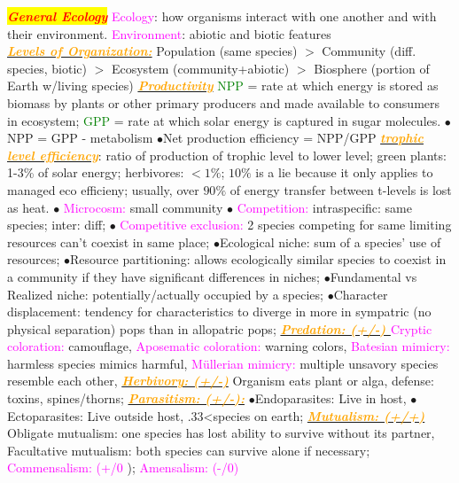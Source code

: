\documentclass{article}
\author{SBHS Science Olympiad, Tarang}
\newcommand{\ddd}{$\bullet$}
\newcommand{\red}[1]{\textcolor{red}{#1}}
\newcommand{\green}[1]{\textcolor{green}{#1}}
\newcommand{\pink}[1]{\textcolor{magenta}{#1}}
\newcommand{\orange}[1]{\textcolor{orange}{#1}}
\newcommand{\mysection}[1]{\colorbox{yellow}{\textbf{\textit{\red{#1}}}}}
\newcommand{\mysubsection}[1]{\underline{\textbf{{\textit{\orange{#1}}}}}}
\begin{document}
\tiny
\begin{multicols*}{4}

    \mysection{General Ecology} 
        \pink{Ecology}: how organisms interact with one another and with their environment. 
        \pink{Environment}: abiotic and biotic features\\
        \mysubsection{\textit{Levels of Organization:}} Population (same species) $>$  Community (diff. species, biotic) $>$ Ecosystem (community+abiotic) $>$ Biosphere (portion of Earth w/living species)
        \mysubsection{Productivity}
        \green{NPP} = rate at which energy is stored as biomass by plants or other primary producers and made available to consumers in ecosystem; \green{GPP} = rate at which solar energy is captured in sugar molecules.
        \ddd NPP = GPP - metabolism \ddd Net production efficiency = NPP/GPP
        \mysubsection{trophic level efficiency}: ratio of production of trophic level to lower level; green plants: 1-3\% of solar energy; herbivores: $ <1\% $; $ 10\% $ is a lie because it only applies to managed eco efficieny; usually, over $ 90\% $ of energy transfer between t-levels is lost as heat.
        \ddd \pink{ Microcosm: } small community 
        \ddd \pink{ Competition: } intraspecific: same species; inter: diff; 
        \ddd \pink{ Competitive exclusion: } 2 species competing for same limiting resources can’t coexist in same place;
        \ddd Ecological niche: sum of a species’ use of resources; 
        \ddd Resource partitioning: allows ecologically similar species to coexist in a community if they have significant differences in niches; 
        \ddd Fundamental vs Realized niche: potentially/actually occupied by a species; 
        \ddd Character displacement: tendency for characteristics to diverge in more in sympatric (no physical separation) pops than in allopatric pops; 
        \mysubsection{ Predation: (+/-) }
        \pink{Cryptic coloration: } camouflage, \pink{ Aposematic coloration: } warning colors, \pink{ Batesian mimicry: } harmless species mimics harmful, \pink{ Müllerian mimicry: } multiple unsavory species resemble each other, 
        \mysubsection{Herbivory: (+/-)} Organism eats plant or alga, defense: toxins, spines/thorns; 
        \mysubsection{Parasitism: (+/-):} 
        \ddd Endoparasites: Live in host, 
        \ddd Ectoparasites: Live outside host, .33<species on earth; 
        \mysubsection{Mutualism: (+/+)}
         Obligate mutualism: one species has lost ability to survive without its partner, Facultative mutualism: both species can survive alone if necessary; \pink{ Commensalism: (+/0 }); \pink{ Amensalism: (-/0) } 

\end{multicols*}
\end{document}
